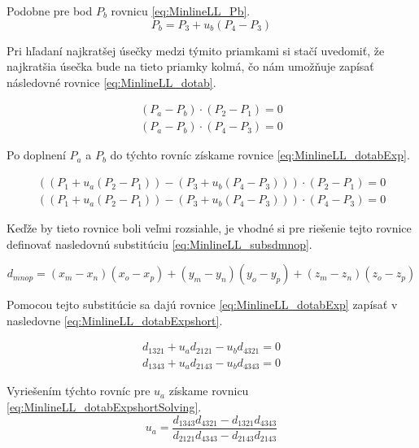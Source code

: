 Podobne pre bod $P_b$ rovnicu \ref{eq:MinlineLL_Pb}.
\begin{equation}
P_b=P_3 + u_b(P_4-P_3)
    \label{eq:MinlineLL_Pb}
\end{equation}

Pri hľadaní najkratšej úsečky medzi týmito priamkami si stačí uvedomiť, že najkratšia úsečka bude na tieto priamky kolmá, čo nám umožňuje zapísať následovné rovnice  \ref{eq:MinlineLL_dotab}.

\begin{equation}
\begin{aligned}
(P_a-P_b) \cdot (P_2-P_1) =0\\
(P_a-P_b) \cdot (P_4-P_3) =0
\end{aligned}
    \label{eq:MinlineLL_dotab}
\end{equation}

Po doplnení  $P_a$ a $P_b$ do týchto rovníc získame rovnice \ref{eq:MinlineLL_dotabExp}.


\begin{equation}
\begin{aligned}
((P_1 + u_a(P_2-P_1))-(P_3 + u_b(P_4-P_3))) \cdot (P_2-P_1) =0\\
((P_1 + u_a(P_2-P_1))-(P_3 + u_b(P_4-P_3))) \cdot (P_4-P_3) =0
\end{aligned}
    \label{eq:MinlineLL_dotabExp}
\end{equation}

Keďže by tieto rovnice boli veľmi rozsiahle, je vhodné si pre riešenie tejto rovnice definovať nasledovnú substitúciu \ref{eq:MinlineLL_subsdmnop}.

\begin{equation}
d_{mnop}=(x_m - x_n)(x_o-x_p)+(y_m - y_n)(y_o-y_p)+(z_m - z_n)(z_o-z_p)
    \label{eq:MinlineLL_subsdmnop}
\end{equation}


Pomocou tejto substitúcie sa dajú rovnice \ref{eq:MinlineLL_dotabExp} zapísať v nasledovne \ref{eq:MinlineLL_dotabExpshort}.


\begin{equation}
\begin{aligned}
d_{1321} + u_a d_{2121} - u_b d_{4321} = 0\\
d_{1343} + u_a d_{2143} - u_b d_{4343} = 0
\end{aligned}
    \label{eq:MinlineLL_dotabExpshort}
\end{equation}

Vyriešením týchto rovníc pre $u_a$ získame rovnicu \ref{eq:MinlineLL_dotabExpshortSolving}.
\begin{equation}
 u_a= \frac
 {d_{1343} d_{4321} - d_{1321} d_{4343} }
 {d_{2121} d_{4343} - d_{2143} d_{2143} }
    \label{eq:MinlineLL_dotabExpshortSolving}
\end{equation}

